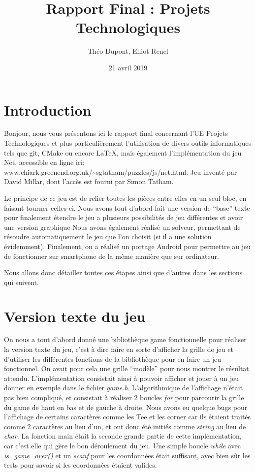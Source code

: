 ﻿\documentclass[12pt]{article}
\title{Rapport Final : Projets Technologiques}
\author{Théo Dupont, Elliot Renel}
\date{21 avril 2019}
\begin{document}
\maketitle


\tableofcontents

\setcounter{page}{1}

\clearpage

\section{Introduction}


Bonjour, nous vous présentons ici le rapport final concernant l'UE Projets Technologiques
et plus particulièrement l'utilisation de divers outils informatiques tels que git, CMake  ou encore \LaTeX, mais également l'implémentation du jeu Net, accessible en ligne ici: {\tiny www.chiark.greenend.org.uk/\textasciitilde sgtatham/puzzles/js/net.html}.
Jeu inventé par David Millar, dont l'accès est fourni par Simon Tatham.


Le principe de ce jeu est de relier toutes les pièces entre elles en un seul bloc, en faisant tourner celles-ci.
Nous avons tout d’abord fait une version de “base” texte pour finalement étendre le jeu a plusieurs possibilités de jeu différentes et avoir une version graphique
Nous avons également réalisé un solveur, permettant de résoudre automatiquement le jeu que l’on choisit (si il a une solution évidemment).
Finalement, on a réalisé un portage Android pour permettre au jeu de fonctionner sur smartphone de la même manière que sur ordinateur.


Nous allons donc détailler toutes ces étapes ainsi que d’autres dans les sections qui suivent.


\section{Version texte du jeu}


On nous a tout d’abord donné une bibliothèque game fonctionnelle pour réaliser la version texte du jeu, c’est à dire faire en sorte d’afficher la grille de jeu et d’utiliser les différentes fonctions de la bibliothèque pour en faire un jeu fonctionnel.
On avait pour cela une grille “modèle” pour nous montrer le résultat attendu.
L’implémentation consistait ainsi à pouvoir afficher et jouer à un jeu donner en exemple dans le fichier \emph{game.h}.
L’algorithmique de l’affichage n’était pas bien compliqué, et consistait à réaliser 2 boucles \emph{for} pour parcourir la grille du game de haut en bas et de gauche à droite. Nous avons eu quelque bugs pour l’affichage de certains caractères comme les Tee et les corner car ils étaient traités comme 2 caractères au lieu d’un, et ont donc été initiés comme \emph{string} au lieu de \emph{char}. La fonction main était la seconde grande partie de cette implémentation, car c’est elle qui gère le bon déroulement du jeu. Une simple boucle \emph{while} avec \emph{is\_game\_over()} et un \emph{scanf} pour les coordonnées était suffisant, avec bien sûr les tests pour savoir si les coordonnées étaient valides.
\end{document}
